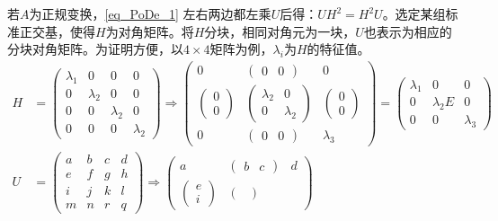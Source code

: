 若$A$为正规变换，\autoref{eq_PoDe_1} 左右两边都左乘$U$后得：$UH^2=H^2U$。选定某组标准正交基，使得$H$为对角矩阵。将$H$分块，相同对角元为一块，$U$也表示为相应的分块对角矩阵。为证明方便，以$4\times 4$矩阵为例，$\lambda_i$为$H$的特征值。
\begin{equation}
\begin{aligned}
H&=\begin{pmatrix}
  \lambda_1&0  & 0 & 0\\
  0& \lambda_2 & 0 & 0\\
 0 &0 &  \lambda_2&0 \\
  0& 0 &0  &\lambda_2
\end{pmatrix}\Rightarrow \begin{pmatrix}
 0&  \begin{pmatrix}
 0 &0
\end{pmatrix}& 0\\
 \begin{pmatrix}
 0\\
0
\end{pmatrix} & \begin{pmatrix}
 \lambda _2 & 0\\
  0& \lambda _2 
\end{pmatrix}  & \begin{pmatrix}
 0\\
0
\end{pmatrix}\\
 0 & \begin{pmatrix}
  0&0
\end{pmatrix} &\lambda_3
\end{pmatrix}=\begin{pmatrix}
 \lambda _1 & 0 &0 \\
 0 & \lambda _2E & 0\\
 0 & 0 &\lambda _3
\end{pmatrix}\\
U&=\begin{pmatrix}
  a& b &c  &d \\
  e&f  &g  &h \\
  i&j  &k  &l \\
  m&n  &r  &q
\end{pmatrix}\Rightarrow \begin{pmatrix}
 a&  \begin{pmatrix}
 b &c
\end{pmatrix}& d\\
 \begin{pmatrix}
 e\\
i
\end{pmatrix} & \begin{pmatrix}

\end{pmatrix}
\end{pmatrix}
\end{aligned}
\end{equation}
